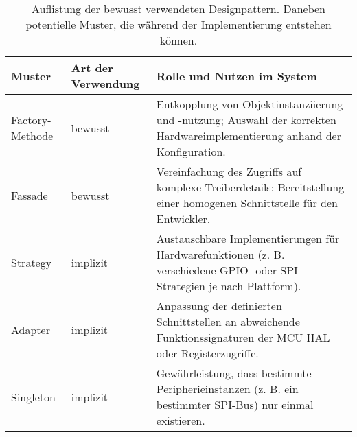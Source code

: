\begin{table}[H]
	\begin{center}
		\begin{tabular}{p{3cm} | p{4cm} | p{7cm}}
			\textbf{Muster} & \textbf{Art der Verwendung} & \textbf{Rolle und Nutzen im System} \\
			\hline
			Factory-Methode & bewusst & Entkopplung von Objektinstanziierung und -nutzung; Auswahl der korrekten Hardwareimplementierung anhand der Konfiguration. \\
			Fassade & bewusst & Vereinfachung des Zugriffs auf komplexe Treiberdetails; Bereitstellung einer homogenen Schnittstelle für den Entwickler. \\
			Strategy & implizit & Austauschbare Implementierungen für Hardwarefunktionen (z. B. verschiedene GPIO- oder SPI-Strategien je nach Plattform). \\
			Adapter & implizit & Anpassung der definierten Schnittstellen an abweichende Funktionssignaturen der MCU HAL oder Registerzugriffe. \\
			Singleton & implizit & Gewährleistung, dass bestimmte Peripherieinstanzen (z. B. ein bestimmter SPI-Bus) nur einmal existieren. \\
			\hline
		\end{tabular}
		\caption{Auflistung der bewusst verwendeten Designpattern. Daneben potentielle Muster, die während der Implementierung entstehen können.}
		\label{tab:unconsious_design_pattern}
	\end{center}
\end{table}



























